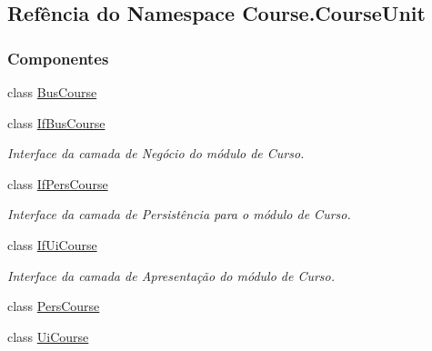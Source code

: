 \hypertarget{namespaceCourse_1_1CourseUnit}{}\subsection{Refência do Namespace Course.\+Course\+Unit}
\label{namespaceCourse_1_1CourseUnit}
\subsubsection*{Componentes}
\begin{DoxyCompactItemize}
\item 
class \hyperlink{classCourse_1_1CourseUnit_1_1BusCourse}{Bus\+Course}
\item 
class \hyperlink{classCourse_1_1CourseUnit_1_1IfBusCourse}{If\+Bus\+Course}
\begin{DoxyCompactList}\small\item\em Interface da camada de Negócio do módulo de Curso. \end{DoxyCompactList}\item 
class \hyperlink{classCourse_1_1CourseUnit_1_1IfPersCourse}{If\+Pers\+Course}
\begin{DoxyCompactList}\small\item\em Interface da camada de Persistência para o módulo de Curso. \end{DoxyCompactList}\item 
class \hyperlink{classCourse_1_1CourseUnit_1_1IfUiCourse}{If\+Ui\+Course}
\begin{DoxyCompactList}\small\item\em Interface da camada de Apresentação do módulo de Curso. \end{DoxyCompactList}\item 
class \hyperlink{classCourse_1_1CourseUnit_1_1PersCourse}{Pers\+Course}
\item 
class \hyperlink{classCourse_1_1CourseUnit_1_1UiCourse}{Ui\+Course}
\end{DoxyCompactItemize}
